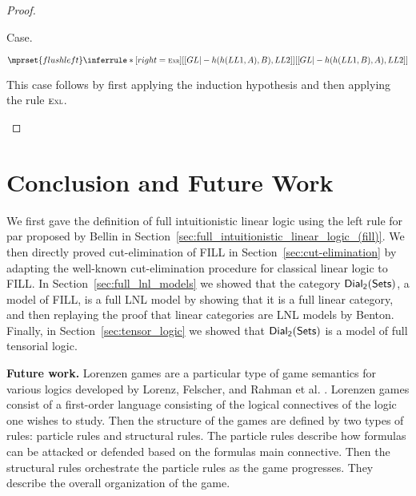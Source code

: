 \begin{proof}
\begin{itemize}
\begin{report}
  \item[] Case.\\ 
    \begin{center}
      \begin{math}
        $$\mprset{flushleft}
        \inferrule* [right=\ifrName{Exr}] {
          [[GL |- h(h(LL1 , A) , B) , LL2]]
        }{[[GL |- h(h(LL1 , B) , A) , LL2]]}
      \end{math}
    \end{center}
    This case follows by first applying the induction hypothesis and then applying
    the rule $\scriptsize \textsc{Exl}$.
    \end{report}
  \end{itemize}
\end{proof}



\section{Conclusion and Future Work}
\label{sec:conclusion_and_future_work}

We first gave the definition of full intuitionistic linear logic using
the left rule for par proposed by Bellin in
Section~\ref{sec:full_intuitionistic_linear_logic_(fill)}.  We then
directly proved cut-elimination of FILL in
Section~\ref{sec:cut-elimination} by adapting the well-known
cut-elimination procedure for classical linear logic to FILL.  In
Section~\ref{sec:full_lnl_models} we showed that the category $\mathsf{Dial_2}(\mathsf{Sets})$,
a model of FILL, is a full LNL model by showing that it is a full
linear category, and then replaying the proof that linear categories
are LNL models by Benton.  Finally, in Section~\ref{sec:tensor_logic}
we showed that $\mathsf{Dial_2}(\mathsf{Sets})$ is a model of full tensorial logic.

\textbf{Future work.} Lorenzen games are a particular type of game
semantics for various logics developed by Lorenz, Felscher, and Rahman
et al. \cite{Keiff:2011,Rahman:2005}. 
Lorenzen games consist of a first-order language consisting of the
logical connectives of the logic one wishes to study.  Then the
structure of the games are defined by two types of rules: particle
rules and structural rules.  The particle rules describe how formulas
can be attacked or defended based on the formulas main connective.
Then the structural rules orchestrate the particle rules as the game
progresses.  They describe the overall organization of the game.

